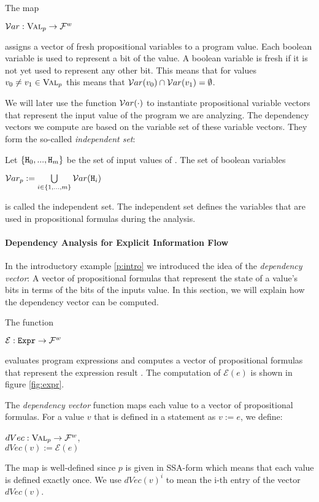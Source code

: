 \begin{definition}
    The map
    \begin{center}
        $\mathcal{V}ar: \textsc{Val}_p \to  \mathcal{F}^w$
    \end{center}
     assigns a vector of fresh propositional variables to a program value. Each boolean variable is used to represent a bit of the value. A boolean variable is fresh if it is not yet used to represent any other bit. This means that for values $v_0 \neq v_1 \in \textsc{Val}_p$ this means that $\mathcal{V}ar(v_0) \cap \mathcal{V}ar(v_1) = \emptyset$.
\end{definition}
We will later use the function $\mathcal{V}ar(\cdot)$ to instantiate propositional variable vectors that represent the input value of the program we are analyzing. The dependency vectors we compute are based on the variable set of these variable vectors. They form the so-called \emph{independent set}:

\begin{definition}
    Let $\{ \mathtt{H}_0, ..., \mathtt{H}_m \}$ be the set of input values of \pp. The set of boolean variables
    \begin{center}
        $\mathcal{V}ar_p := \bigcup\limits_{i \in \{1,..., m\}} \mathcal{V}ar(\mathtt{H}_i)$
    \end{center}
    is called the independent set. The independent set defines the variables that are used in propositional formulas during the analysis.
\end{definition}

\paragraph{Dependency Analysis for Explicit Information Flow}

In the introductory example \ref{p:intro} we introduced the idea of the \emph{dependency vector}: A vector of propositional formulas that represent the state of a value's bits in terms of the bits of the inputs value. In this section, we will explain how the dependency vector can be computed.

\begin{definition}
     The function
    \begin{center}
        $\mathcal{E}: \mathtt{Expr} \to \mathcal{F}^w$
    \end{center}
    evaluates program expressions and computes a vector of propositional formulas that represent the expression result . The computation of $\mathcal{E}(e)$ is shown in figure \ref{fig:expr}.
    
    The \emph{dependency vector} function maps each value to a vector of propositional formulas. For a value $v$ that is defined in a statement as $v := e$, we define:
    \begin{center}
        $dVec: \textsc{Val}_p \to \mathcal{F}^w$,\\
        $dVec(v) := \mathcal{E}(e)$
    \end{center}
    The map is well-defined since $p$ is given in SSA-form which means that each value is defined exactly once.
    We use $dVec(v)^i$ to mean the i-th entry of the vector $dVec(v)$.
\end{definition}

